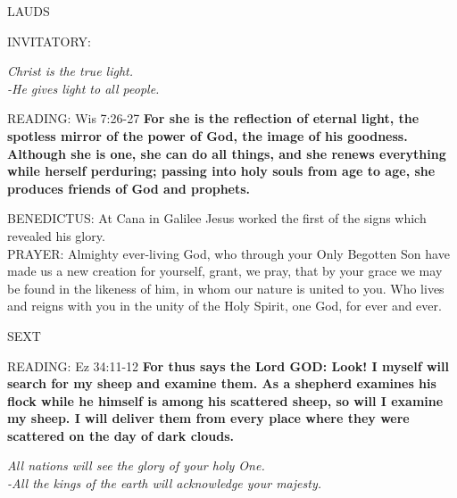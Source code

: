 \begin{flushleft}\normalsize{\uppercase{LAUDS\\}}\end{flushleft}
\small{\uppercase{INVITATORY:}}\normalsize
\begin{center}
\textit{Christ is the true light.\\}
\textit{-He gives light to all people.\\}
\end{center}
\noindent\small{\uppercase{READING:}}   Wis 7:26-27 \textbf{  For she is the reflection of eternal light, the spotless mirror of the power of God, the image of his goodness. Although she is one, she can do all things, and she renews everything while herself perduring; passing into holy souls from age to age, she produces friends of God and prophets.\\}

\noindent\small{\uppercase{BENEDICTUS:}}	At Cana in Galilee Jesus worked the first of the signs which revealed his glory.\\

\noindent\small{\uppercase{PRAYER:}}	Almighty ever-living God, who through your Only Begotten Son have made us a new creation for yourself, grant, we pray, that by your grace we may be found in the likeness of him, in whom our nature is united to you. Who lives and reigns with you in the unity of the Holy Spirit, one God, for ever and ever.

\begin{flushleft}\normalsize{\uppercase{SEXT\\}}\end{flushleft}
\noindent\small{\uppercase{READING:}}   Ez 34:11-12 \textbf{  For thus says the Lord GOD: Look! I myself will search for my sheep and examine them. As a shepherd examines his flock while he himself is among his scattered sheep, so will I examine my sheep. I will deliver them from every place where they were scattered on the day of dark clouds.}
\begin{center}\textit{All nations will see the glory of your holy One.\\
-All the kings of the earth will acknowledge your majesty.}\end{center}
